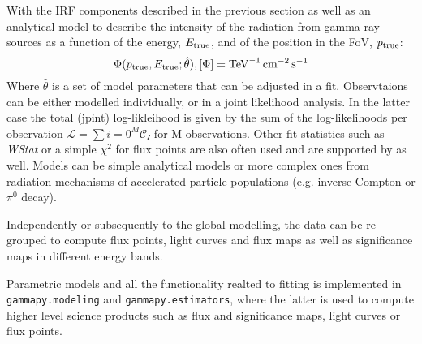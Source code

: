 \documentclass[longauth]{aa}
\newcommand{\code}[1]{\texttt{#1}}
\begin{document}
With the IRF components described in the previous section as well as an analytical model to describe the
intensity of the radiation from gamma-ray sources as a function of the energy, $E_{\rm true}$,
and of the position in the FoV, $p_{\rm true}$:
%
\begin{equation}
    \Phi(p_{\rm true}, E_{\rm true}; \hat{\theta}), [\Phi] = \si{TeV^{-1}.cm^{-2}.s^{-1}}
    \label{eq:general_source_model}
\end{equation}
Where $\hat{\theta}$ is a set of model parameters that can be adjusted in a fit. 
Observtaions can be either modelled individually, or in a joint likelihood analysis.
In the latter case the total (jpint) log-likleihood is given by the sum of the log-likelihoods
per observation $\mathcal{L} = \sum{i=0}^M \mathcal{C_i}$ for M observations. Other fit
statistics such as \textit{WStat} or a simple $\chi^2$ for flux points are also often used
and are supported by \gammapy as well. Models can be simple analytical models or more complex
ones from radiation mechanisms of accelerated particle populations (e.g. inverse Compton or $\pi^{0}$ decay).

Independently or subsequently to the global modelling, the data can be re-grouped to compute
flux points, light curves and flux maps as well as significance maps in different energy bands.

Parametric models and all the functionality realted to fitting is implemented in 
\code{gammapy.modeling} and \code{gammapy.estimators}, where the latter is used to
compute higher level science products such as flux and significance maps,
light curves or flux points. 



 
 
\end{document}
